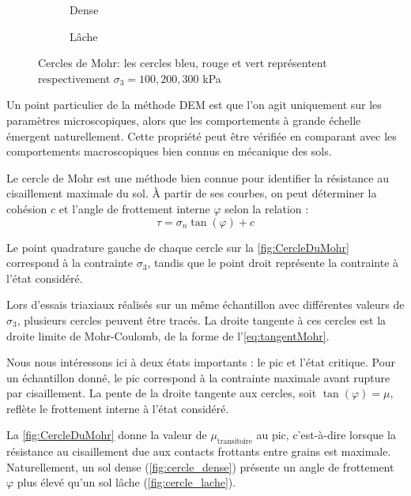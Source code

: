 \documentclass[a4paper,12pt]{report}
\begin{document}
\begin{figure}[h!]
    \centering
    \begin{subfigure}[b]{0.48\textwidth}
        \centering
        \scalebox{0.6}{}
        \caption{Dense}
        \label{fig:cercle_dense}
    \end{subfigure}
    \hfill
    \begin{subfigure}[b]{0.48\textwidth}
        \centering
        \scalebox{0.65}{}
        \caption{Lâche}
        \label{fig:cercle_lache}
    \end{subfigure}
    \caption{Cercles de Mohr: les cercles bleu, rouge et vert représentent respectivement $\sigma_3 = 100, 200, 300$ kPa}
    \label{fig:CercleDuMohr}
\end{figure}

Un point particulier de la méthode DEM est que l’on agit uniquement sur les paramètres microscopiques, alors que les comportements à grande échelle émergent naturellement.  
Cette propriété peut être vérifiée en comparant avec les comportements macroscopiques bien connus en mécanique des sols.  

Le cercle de Mohr est une méthode bien connue pour identifier la résistance au cisaillement maximale du sol.  
À partir de ses courbes, on peut déterminer la cohésion $c$ et l’angle de frottement interne $\varphi$ selon la relation :
\begin{equation}
    \tau = \sigma_n \tan(\varphi) + c
    \label{eq:tangentMohr}
\end{equation}

Le point quadrature gauche de chaque cercle sur la \autoref{fig:CercleDuMohr} correspond à la contrainte $\sigma_3$, tandis que le point droit représente la contrainte à l’état considéré.  

Lors d’essais triaxiaux réalisés sur un même échantillon avec différentes valeurs de $\sigma_3$, plusieurs cercles peuvent être tracés. La droite tangente à ces cercles est la droite limite de Mohr-Coulomb, de la forme de l'\autoref{eq:tangentMohr}.  

Nous nous intéressons ici à deux états importants : le pic et l’état critique.  
Pour un échantillon donné, le pic correspond à la contrainte maximale avant rupture par cisaillement.  
La pente de la droite tangente aux cercles, soit $\tan(\varphi) = \mu$, reflète le frottement interne à l’état considéré.  

La \autoref{fig:CercleDuMohr} donne la valeur de $\mu_{\text{transitoire}}$ au pic, c’est-à-dire lorsque la résistance au cisaillement due aux contacts frottants entre grains est maximale.  
Naturellement, un sol dense (\autoref{fig:cercle_dense}) présente un angle de frottement $\varphi$ plus élevé qu’un sol lâche (\autoref{fig:cercle_lache}).  
\end{document}

